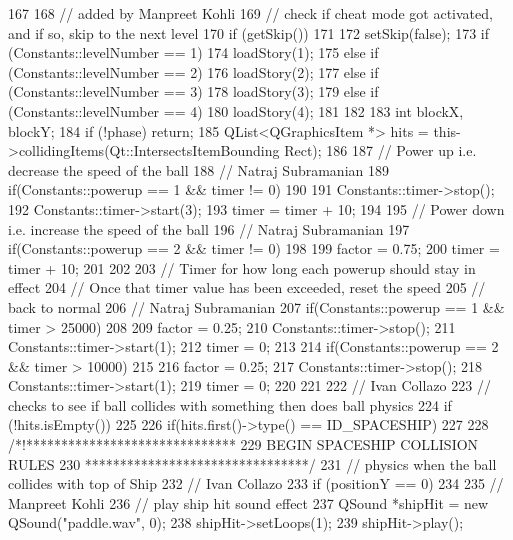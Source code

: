 \begin{DoxyCode}
167 {
168     // added by Manpreet Kohli
169     // check if cheat mode got activated, and if so, skip to the next level
170     if (getSkip())
171     {
172         setSkip(false);
173         if (Constants::levelNumber == 1)
174             loadStory(1);
175         else if (Constants::levelNumber == 2)
176             loadStory(2);
177         else if (Constants::levelNumber == 3)
178             loadStory(3);
179         else if (Constants::levelNumber == 4)
180             loadStory(4);
181     }
182 
183     int blockX, blockY;
184     if (!phase) return;
185     QList<QGraphicsItem *> hits = this->collidingItems(Qt::IntersectsItemBounding
      Rect);
186     
187     // Power up i.e. decrease the speed of the ball
188     // Natraj Subramanian
189     if(Constants::powerup == 1 && timer != 0)
190     {
191         Constants::timer->stop();
192         Constants::timer->start(3);
193         timer = timer + 10;
194     }
195     // Power down i.e. increase the speed of the ball
196     // Natraj Subramanian
197     if(Constants::powerup == 2 && timer != 0)
198     {
199         factor = 0.75;
200         timer = timer + 10;
201     }
202 
203     // Timer for how long each powerup should stay in effect
204     // Once that timer value has been exceeded, reset the speed
205     // back to normal
206     // Natraj Subramanian
207     if(Constants::powerup == 1 && timer > 25000)
208     {
209         factor = 0.25;
210         Constants::timer->stop();
211         Constants::timer->start(1);
212         timer = 0;
213     }
214     if(Constants::powerup == 2 && timer > 10000)
215     {
216         factor = 0.25;
217         Constants::timer->stop();
218         Constants::timer->start(1);
219         timer = 0;
220     }
221 
222     // Ivan Collazo
223     // checks to see if ball collides with something then does ball physics
224     if (!hits.isEmpty())
225     {
226         if(hits.first()->type() == ID_SPACESHIP)
227         {           
228                  /*!******************************
229                    BEGIN SPACESHIP COLLISION RULES
230                   ********************************/
231             // physics when the ball collides with top of Ship
232             // Ivan Collazo
233             if (positionY == 0)
234             {                
235                 // Manpreet Kohli
236                 // play ship hit sound effect
237                 QSound *shipHit = new QSound("paddle.wav", 0);
238                 shipHit->setLoops(1);
239                 shipHit->play();
}}}}
\end{DoxyCode}
